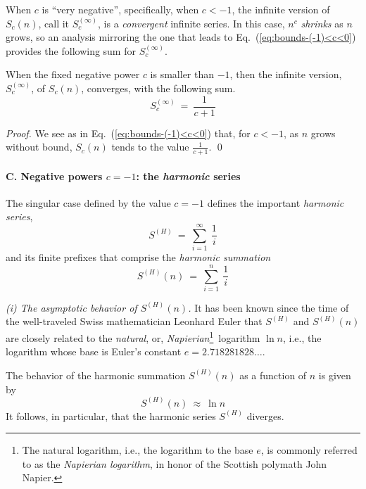 When $c$ is ``very negative'', specifically, when $c < -1$, the infinite version of $S_c(n)$, call it $S_c^{(\infty)}$, is a {\em convergent} infinite series.  In this case, $n^c$ {\em shrinks} as $n$ grows, so an analysis mirroring the one that leads to Eq.~(\ref{eq:bounds-(-1)<c<0}) provides the following sum for $S_c^{(\infty)}$.

\begin{prop}
\label{thm:bounds-negative-(not-1)-sum-xc}
When the fixed negative power $c$ is smaller than $-1$, then the infinite version, $S_c^{(\infty)}$, of $S_c(n)$, converges, with the following sum.
\begin{equation}
\label{eq:bounds-negative-(not-1)-sum-xc}
S_c^{(\infty)} \ = \ \frac{1}{c+1}
\end{equation}
\end{prop}

\begin{proof}
We see as in Eq.~(\ref{eq:bounds-(-1)<c<0}) that, for $c<-1$, as $n$ grows without bound, $S_c(n)$ tends to the value ${\displaystyle \frac{1}{c+1}}$.  \qed
\end{proof}

\paragraph{C. Negative powers $c = -1$: the {\em harmonic} series}

The singular case defined by the value $c = -1$ defines the important {\it harmonic series},
\[ S^{(H)} \ = \ \sum_{i=1}^\infty \ \frac{1}{i} \]
and its finite prefixes that comprise the {\it harmonic summation}
\[ S^{(H)}(n) \ = \ \sum_{i=1}^n \ \frac{1}{i} \]

\smallskip

 
 
{\it (i) The asymptotic behavior of $S^{(H)}(n)$.}
It has been known since the time of the well-traveled Swiss mathematician Leonhard Euler that $S^{(H)}$ and $S^{(H)}(n)$ are closely related to the {\em natural}, or, {\it Napierian}\footnote{The natural logarithm, i.e., the logarithm to the base $e$, is commonly referred to as the {\it Napierian logarithm}, in honor of the Scottish polymath John Napier.}~logarithm $\ln n$, i.e., the logarithm whose base is Euler's constant $e = 2.718281828 \ldots$.

\begin{prop}
\label{thm:harmonic}
The behavior of the harmonic summation $S^{(H)}(n)$ as a function of $n$ is given by
\[ S^{(H)}(n) \ \approx \ \ln n \]
It follows, in particular, that the harmonic series $S^{(H)}$ diverges.
\end{prop}

